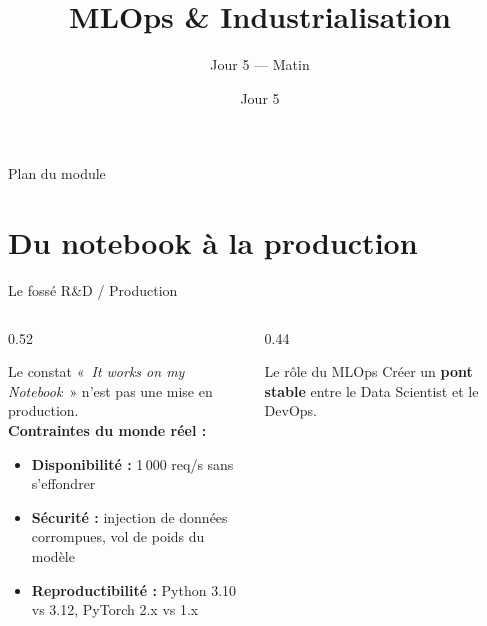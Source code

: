 \documentclass[aspectratio=169, 10pt]{beamer}
\title[MLOps]{MLOps \& Industrialisation}
\subtitle{Jour 5 --- Matin}
\date{Jour 5}
\begin{document}

\begin{frame}
  \titlepage
\end{frame}

\begin{frame}{Plan du module}
  \tableofcontents
\end{frame}

\section{Du notebook à la production}

\begin{frame}{Le fossé R\&D / Production}
  \begin{columns}[T]
    \begin{column}{0.52\textwidth}
      \begin{alertblock}{Le constat}
        «~\textit{It works on my Notebook}~» n'est pas
        une mise en production.\\[4pt]
        \textbf{Contraintes du monde réel :}
        \begin{itemize}
          \item \textbf{Disponibilité :} 1\,000 req/s sans s'effondrer
          \item \textbf{Sécurité :} injection de données corrompues,
                vol de poids du modèle
          \item \textbf{Reproductibilité :} Python 3.10 vs 3.12,
                PyTorch 2.x vs 1.x
        \end{itemize}
      \end{alertblock}
    \end{column}
    \begin{column}{0.44\textwidth}
      \begin{exampleblock}{Le rôle du MLOps}
        Créer un \textbf{pont stable} entre le
        Data Scientist et le DevOps.
        \vspace{4pt}
        \begin{center}
\end{center}
\end{exampleblock}
\end{column}
\end{columns}
\end{frame}
\end{document}
